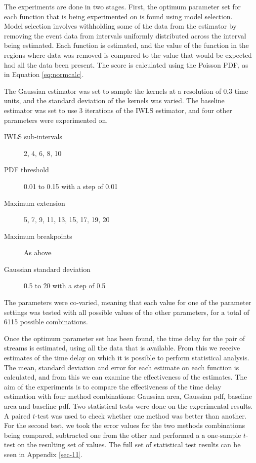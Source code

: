 \documentclass[a4paper,11pt,twoside]{article}
\begin{document}
  The experiments are done in two stages. First, the optimum parameter set for
  each function that is being experimented on is found using model
  selection. Model selection involves withholding some of the data from the
  estimator by removing the event data from intervals uniformly distributed
  across the interval being estimated. Each function is estimated, and the value
  of the function in the regions where data was removed is compared to the value
  that would be expected had all the data been present. The score is calculated
  using the Poisson PDF, as in Equation \eqref{eq:normcalc}.

  The Gaussian estimator was set to sample the kernels at a resolution of 0.3
  time units, and the standard deviation of the kernels was varied. The baseline
  estimator was set to use 3 iterations of the IWLS estimator, and four other
  parameters were experimented on.
  \begin{description}
  \item[IWLS sub-intervals] 2, 4, 6, 8, 10
  \item[PDF threshold] 0.01 to 0.15 with a step of 0.01
  \item[Maximum extension] 5, 7, 9, 11, 13, 15, 17, 19, 20
  \item[Maximum breakpoints] As above
  \item[Gaussian standard deviation] 0.5 to 20 with a step of 0.5
  \end{description}
  The parameters were co-varied, meaning that each value for one
  of the parameter settings was tested with all possible values of the other
  parameters, for a total of 6115 possible combinations.

  Once the optimum parameter set has been found, the time delay for the pair of
  streams is estimated, using all the data that is available. From this we
  receive estimates of the time delay on which it is possible to perform
  statistical analysis. The mean, standard deviation and error for each estimate
  on each function is calculated, and from this we can examine the effectiveness
  of the estimates. The aim of the experiments is to compare the effectiveness
  of the time delay estimation with four method combinations: Gaussian area,
  Gaussian pdf, baseline area and baseline pdf. Two statistical tests were done
  on the experimental results. A paired $t$-test was used to check whether one
  method was better than another. For the second test, we took the error values
  for the two methods combinations being compared, subtracted one from the other
  and performed a a one-sample $t$-test on the resulting set of values. The full
  set of statistical test results can be seen in Appendix \ref{sec-11}.
\end{document}
